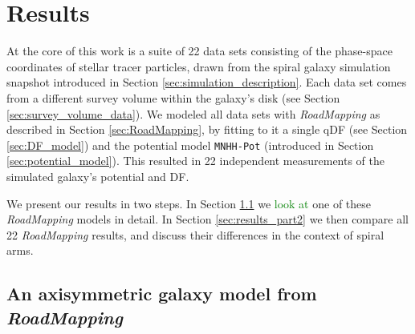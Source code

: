 \documentclass[iop,revtex4,numberedappendix,appendixfloats]{emulateapj}
\newcommand{\RM}{{\sl RoadMapping}}
\newcommand{\NEW}[1]{\textcolor{Green}{#1}}
\newcommand{\OLD}[1]{}
\begin{document}
\section{Results} \label{sec:results}

At the core of this work is a suite of 22 data sets consisting of the phase-space coordinates of stellar tracer particles, drawn from the spiral galaxy simulation snapshot introduced in Section \ref{sec:simulation_description}. Each data set comes from a different survey volume within the galaxy's disk (see Section \ref{sec:survey_volume_data}). We model\OLD{l}ed all data sets with \RM{} as described in Section \ref{sec:RoadMapping}, by fitting to it a single qDF (see Section \ref{sec:DF_model}) and the potential model \texttt{MNHH-Pot} (introduced in Section \ref{sec:potential_model})\OLD{, comprised of a Miyamoto-Nagai disk, a Hernquist halo and a (fixed) Hernquist bulge}. This resulted in 22 independent measurements of the simulated galaxy's potential and DF.

We present our results in two steps. In Section \ref{sec:results_part1} we \OLD{discuss all aspects of}\NEW{look at} one of these \RM{} models in detail. In Section \ref{sec:results_part2} we then compare all 22 \RM{} results, and discuss their differences in the context of spiral arms\OLD{ of different strength crossing the respective survey volumes}.

\subsection{An axisymmetric galaxy model from \RM{}} \label{sec:results_part1}
\end{document}
